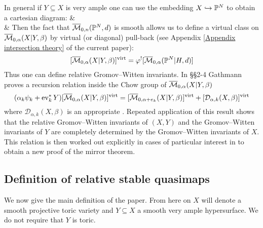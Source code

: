 In general if $Y \subseteq X$ is very ample one can use the embedding $X \hookrightarrow \mathbb P^N$ to obtain a cartesian diagram:
\bcd
{} \ar[r] \ar[d]  &  \ar[d] \\
 \ar[r,"\varphi"] & 
\ecd
Then the fact that $\overline{\mathcal M}_{0,n}(\mathbb P^N,d)$ is smooth allows us to define a virtual class on $\overline{\mathcal M}_{0,\alpha}(X|Y,\beta)$ by virtual (or diagonal) pull-back (see Appendix \ref{Appendix intersection theory} of the current paper):
\begin{equation*} [\overline{\mathcal M}_{0,\alpha}(X|Y,\beta)]^{\operatorname{virt}} = \varphi^! [\overline{\mathcal M}_{0,\alpha}(\mathbb P^N|H,d)] \end{equation*}
Thus one can define relative Gromov--Witten invariants. In \S\S 2-4 Gathmann proves a recursion relation inside the Chow group of $\overline{\mathcal M}_{0,\alpha}(X|Y,\beta)$
\begin{equation*} (\alpha_k \psi_k + \operatorname{ev}_k^* Y) [\overline{\mathcal M}_{0,\alpha}(X|Y,\beta)]^{\operatorname{virt}} = [\overline{\mathcal M}_{0,\alpha+e_k}(X|Y,\beta)]^{\operatorname{virt}} + [\mathcal{D}_{\alpha,k}(X,\beta)]^{\operatorname{virt}} \end{equation*}
where $\mathcal{D}_{\alpha,k}(X,\beta)$ is an appropriate . Repeated application of this result shows that the relative Gromov--Witten invariants of $(X,Y)$ and the Gromov--Witten invariants of $Y$ are completely determined by the Gromov--Witten invariants of $X$. This relation is then worked out explicitly in cases of particular interest in \cite{Ga-MF} to obtain a new proof of the mirror theorem.

\subsection{Definition of relative stable quasimaps} \label{Subsection relative stable quasimaps}

We now give the main definition of the paper. From here on $X$ will denote a smooth projective toric variety and $Y \subseteq X$ a smooth very ample hypersurface. We do not require that $Y$ is toric.

